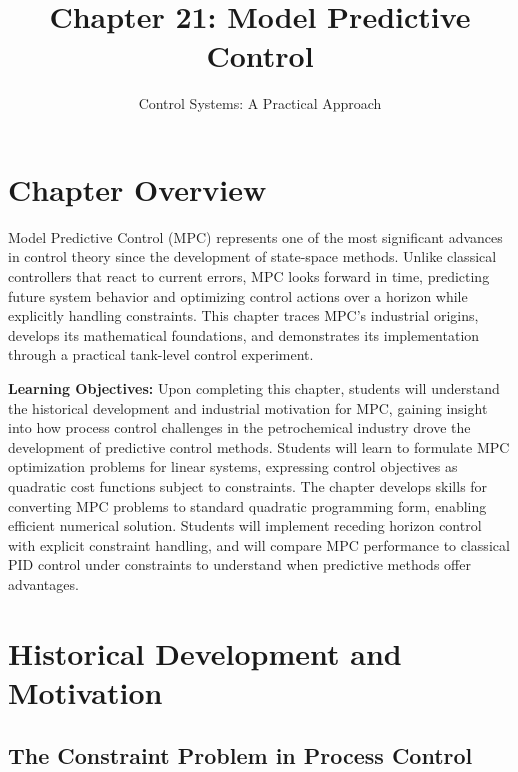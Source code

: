 
\title{Chapter 21: Model Predictive Control}
\author{Control Systems: A Practical Approach}
\maketitle

\section*{Chapter Overview}

Model Predictive Control (MPC) represents one of the most significant advances in control theory since the development of state-space methods. Unlike classical controllers that react to current errors, MPC looks forward in time, predicting future system behavior and optimizing control actions over a horizon while explicitly handling constraints. This chapter traces MPC's industrial origins, develops its mathematical foundations, and demonstrates its implementation through a practical tank-level control experiment.

\vspace{1em}
\noindent\textbf{Learning Objectives:}
Upon completing this chapter, students will understand the historical development and industrial motivation for MPC, gaining insight into how process control challenges in the petrochemical industry drove the development of predictive control methods. Students will learn to formulate MPC optimization problems for linear systems, expressing control objectives as quadratic cost functions subject to constraints. The chapter develops skills for converting MPC problems to standard quadratic programming form, enabling efficient numerical solution. Students will implement receding horizon control with explicit constraint handling, and will compare MPC performance to classical PID control under constraints to understand when predictive methods offer advantages.

\section{Historical Development and Motivation}
\label{sec:history}

\subsection{The Constraint Problem in Process Control}

